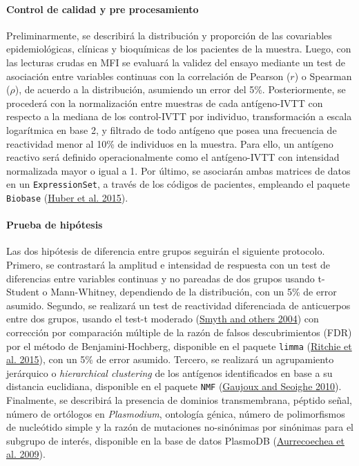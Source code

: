 \documentclass[
  a4paper]{article}
\begin{document}
\hypertarget{control-de-calidad-y-pre-procesamiento}{%
\paragraph{Control de calidad y pre
procesamiento}\label{control-de-calidad-y-pre-procesamiento}}

Preliminarmente, se describirá la distribución y proporción de las
covariables epidemiológicas, clínicas y bioquímicas de los pacientes de
la muestra. Luego, con las lecturas crudas en MFI se evaluará la validez
del ensayo mediante un test de asociación entre variables continuas con
la correlación de Pearson (\(r\)) o Spearman (\(\rho\)), de acuerdo a la
distribución, asumiendo un error del 5\%. Posteriormente, se procederá
con la normalización entre muestras de cada antígeno-IVTT con respecto a
la mediana de los control-IVTT por individuo, transformación a escala
logarítmica en base 2, y filtrado de todo antígeno que posea una
frecuencia de reactividad menor al 10\% de individuos en la muestra.
Para ello, un antígeno reactivo será definido operacionalmente como el
antígeno-IVTT con intensidad normalizada mayor o igual a 1. Por último,
se asociarán ambas matrices de datos en un \texttt{ExpressionSet}, a
través de los códigos de pacientes, empleando el paquete
\texttt{Biobase} (\protect\hyperlink{ref-Biobase}{Huber et al. 2015}).

\hypertarget{prueba-de-hipuxf3tesis}{%
\paragraph{Prueba de hipótesis}\label{prueba-de-hipuxf3tesis}}

Las dos hipótesis de diferencia entre grupos seguirán el siguiente
protocolo. Primero, se contrastará la amplitud e intensidad de respuesta
con un test de diferencias entre variables continuas y no pareadas de
dos grupos usando t-Student o Mann-Whitney, dependiendo de la
distribución, con un 5\% de error asumido. Segundo, se realizará un test
de reactividad diferenciada de anticuerpos entre dos grupos, usando el
test-t moderado (\protect\hyperlink{ref-smyth2004ebayes}{Smyth and
others 2004}) con corrección por comparación múltiple de la razón de
falsos descubrimientos (FDR) por el método de Benjamini-Hochberg,
disponible en el paquete \texttt{limma}
(\protect\hyperlink{ref-limma}{Ritchie et al. 2015}), con un 5\% de
error asumido. Tercero, se realizará un agrupamiento jerárquico o
\emph{hierarchical clustering} de los antígenos identificados en base a
su distancia euclidiana, disponible en el paquete \texttt{NMF}
(\protect\hyperlink{ref-Gaujoux2010NMF}{Gaujoux and Seoighe 2010}).
Finalmente, se describirá la presencia de dominios transmembrana,
péptido señal, número de ortólogos en \emph{Plasmodium}, ontología
génica, número de polimorfismos de nucleótido simple y la razón de
mutaciones no-sinónimas por sinónimas para el subgrupo de interés,
disponible en la base de datos PlasmoDB
(\protect\hyperlink{ref-plasmodb}{Aurrecoechea et al. 2009}).
\end{document}
